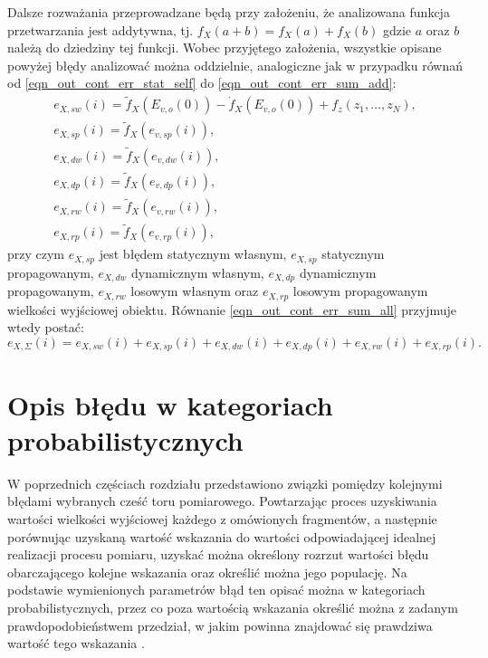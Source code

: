 Dalsze rozważania przeprowadzane będą przy założeniu, że analizowana funkcja przetwarzania jest addytywna, tj. $f_{X}(a + b) = f_{X}(a) + f_{X}(b)$ gdzie $a$ oraz $b$ należą do dziedziny tej funkcji. Wobec przyjętego założenia, wszystkie opisane powyżej błędy analizować można oddzielnie, analogiczne jak w przypadku równań od \eqref{eqn_out_cont_err_stat_self} do \eqref{eqn_out_cont_err_sum_add}:
\begin{gather}
e_{X,sw} \left( i \right) = \tilde{f}_{X} \left( E_{v,o} \left( 0 \right) \right) - \dot{f}_{X} \left( E_{v,o} \left( 0 \right) \right) + f_{z} \left( z_{1}, \hdots, z_{N} \right) \label{eqn_out_disc_err_stat_self}, \\
e_{X,sp} \left( i \right) = \tilde{f}_{X} \left( e_{v,sp} \left( i \right) \right) \label{eqn_out_disc_err_stat_prop}, \\
e_{X,dw} \left( i \right) = \tilde{f}_{X} \left( e_{v,dw} \left( i \right) \right) \label{eqn_out_disc_err_dyn_prop}, \\
e_{X,dp} \left( i \right) = \tilde{f}_{X} \left( e_{v,dp} \left( i \right) \right) \label{eqn_out_disc_err_dyn_self}, \\
e_{X,rw} \left( i \right) = \tilde{f}_{X} \left( e_{v,rw} \left( i \right) \right) \label{eqn_out_disc_err_rand_self}, \\
e_{X,rp} \left( i \right) = \tilde{f}_{X} \left( e_{v,rp} \left( i \right) \right) \label{eqn_out_disc_err_rand_prop},
\end{gather}
przy czym $e_{X,sp}$ jest błędem statycznym własnym, $e_{X,sp}$ statycznym propagowanym, $e_{X,dw}$ dynamicznym własnym, $e_{X,dp}$ dynamicznym propagowanym, $e_{X,rw}$ losowym własnym oraz $e_{X,rp}$ losowym propagowanym wielkości wyjściowej obiektu. Równanie \eqref{eqn_out_cont_err_sum_all} przyjmuje wtedy postać:
\begin{equation}
e_{X,\Sigma} \left( i \right) = e_{X,sw} \left( i \right) + e_{X,sp} \left( i \right) + e_{X,dw} \left( i \right) + e_{X,dp} \left( i \right) + e_{X,rw} \left( i \right) + e_{X,rp} \left( i \right) \label{eqn_out_disc_err_sum_add}.
\end{equation}

\section{Opis błędu w kategoriach probabilistycznych}

W poprzednich częściach rozdziału przedstawiono związki pomiędzy kolejnymi błędami wybranych cześć toru pomiarowego. Powtarzając proces uzyskiwania wartości wielkości wyjściowej każdego z omówionych fragmentów, a następnie porównując uzyskaną wartość wskazania do wartości odpowiadającej idealnej realizacji procesu pomiaru, uzyskać można określony rozrzut wartości błędu obarczającego kolejne wskazania oraz określić można jego populację. Na podstawie wymienionych parametrów błąd ten opisać można w kategoriach probabilistycznych, przez co poza wartością wskazania określić można z zadanym prawdopodobieństwem przedział, w jakim powinna znajdować się prawdziwa wartość tego wskazania \cite{jcgm_guide}.

